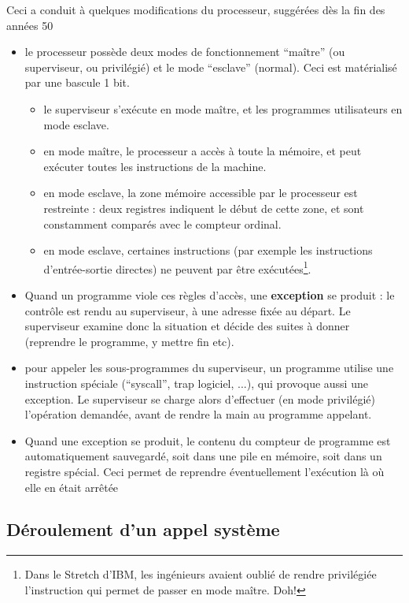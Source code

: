 \begin{multicols}{2}
Ceci a conduit à quelques modifications du processeur, suggérées dès la fin des années 50
\begin{itemize}
\item le processeur possède deux modes de fonctionnement ``maître'' (ou superviseur, ou privilégié) et le mode ``esclave'' (normal). Ceci est matérialisé
par une bascule 1 bit.
\begin{itemize}
\item le superviseur s'exécute en mode maître, et les programmes utilisateurs en mode esclave.
\item en mode maître, le processeur a accès à toute la mémoire, et
  peut exécuter toutes les instructions de la machine.
\item en mode esclave, la zone mémoire accessible par le processeur
  est restreinte : deux registres indiquent le début de cette zone, et
  sont constamment comparés avec le compteur ordinal.
\item en mode esclave, certaines instructions (par exemple les
  instructions d'entrée-sortie directes) ne peuvent par être
  exécutées\footnote{Dans le Stretch d'IBM, les ingénieurs avaient oublié
    de rendre privilégiée l'instruction qui permet de passer en mode
    maître. Doh! }.
\end{itemize}
\item Quand un programme viole ces règles d'accès, une
  \textbf{exception} se produit : le contrôle est rendu au
  superviseur, à une adresse fixée au départ. Le superviseur examine
  donc la situation et décide des suites à donner (reprendre le
  programme, y mettre fin etc).
\item pour appeler les sous-programmes du superviseur, un programme
  utilise une instruction spéciale (``syscall'', trap logiciel, ...),
  qui provoque aussi une exception. Le superviseur se charge alors
  d'effectuer (en mode privilégié) l'opération demandée, avant de
  rendre la main au programme appelant.
\item Quand une exception se produit, le contenu du compteur de programme
est automatiquement sauvegardé, soit dans une pile en mémoire,
soit dans un registre spécial. Ceci permet de reprendre éventuellement 
l'exécution
là où elle en était arrêtée
\end{itemize}

\subsection{Déroulement d'un appel système}


\end{multicols}
